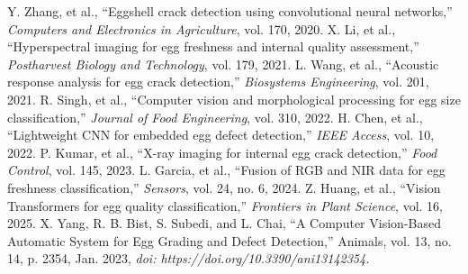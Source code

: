 \documentclass[conference]{IEEEtran}
\begin{document}
	\begin{thebibliography}{00}
		 Y. Zhang, et al., ``Eggshell crack detection using convolutional neural networks,'' \textit{Computers and Electronics in Agriculture}, vol. 170, 2020.
		 X. Li, et al., ``Hyperspectral imaging for egg freshness and internal quality assessment,'' \textit{Postharvest Biology and Technology}, vol. 179, 2021.
		 L. Wang, et al., ``Acoustic response analysis for egg crack detection,'' \textit{Biosystems Engineering}, vol. 201, 2021.
		 R. Singh, et al., ``Computer vision and morphological processing for egg size classification,'' \textit{Journal of Food Engineering}, vol. 310, 2022.
		 H. Chen, et al., ``Lightweight CNN for embedded egg defect detection,'' \textit{IEEE Access}, vol. 10, 2022.
		 P. Kumar, et al., ``X-ray imaging for internal egg crack detection,'' \textit{Food Control}, vol. 145, 2023.
		 L. Garcia, et al., ``Fusion of RGB and NIR data for egg freshness classification,'' \textit{Sensors}, vol. 24, no. 6, 2024.
		 Z. Huang, et al., ``Vision Transformers for egg quality classification,'' \textit{Frontiers in Plant Science}, vol. 16, 2025.
		 X. Yang, R. B. Bist, S. Subedi, and L. Chai, “A Computer Vision-Based Automatic System for Egg Grading and Defect Detection,” Animals, vol. 13, no. 14, p. 2354, Jan. 2023, \textit{doi: https://doi.org/10.3390/ani13142354.}
		‌
	\end{thebibliography}
	
\end{document}
